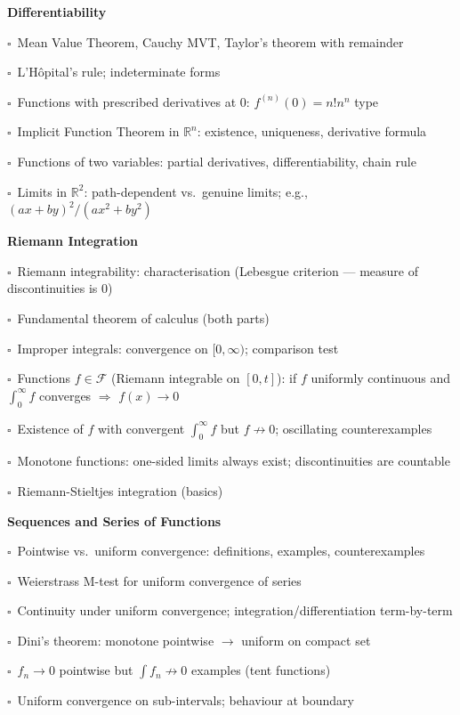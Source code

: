 \documentclass[11pt,a4paper]{article}
\newcommand{\chk}{\textcolor{rulegray}{$\square$}\ }
\begin{document}
\begin{subtopics}
  \item \textbf{Differentiability}
  \begin{subtopics}
    \item \chk Mean Value Theorem, Cauchy MVT, Taylor's theorem with remainder
    \item \chk L'H\^{o}pital's rule; indeterminate forms
    \item \chk Functions with prescribed derivatives at $0$: $f^{(n)}(0)= n!n^n$ type
    \item \chk Implicit Function Theorem in $\mathbb{R}^n$: existence, uniqueness, derivative formula
    \item \chk Functions of two variables: partial derivatives, differentiability, chain rule
    \item \chk Limits in $\mathbb{R}^2$: path-dependent vs.\ genuine limits; e.g., $(ax+by)^2/(ax^2+by^2)$
  \end{subtopics}

  \item \textbf{Riemann Integration}
  \begin{subtopics}
    \item \chk Riemann integrability: characterisation (Lebesgue criterion — measure of discontinuities is 0)
    \item \chk Fundamental theorem of calculus (both parts)
    \item \chk Improper integrals: convergence on $[0,\infty)$; comparison test
    \item \chk Functions $f \in \mathcal{F}$ (Riemann integrable on $[0,t]$): if $f$ uniformly continuous and $\int_0^\infty f$ converges $\Rightarrow$ $f(x)\to 0$
    \item \chk Existence of $f$ with convergent $\int_0^\infty f$ but $f \not\to 0$; oscillating counterexamples
    \item \chk Monotone functions: one-sided limits always exist; discontinuities are countable
    \item \chk Riemann-Stieltjes integration (basics)
  \end{subtopics}

  \item \textbf{Sequences and Series of Functions}
  \begin{subtopics}
    \item \chk Pointwise vs.\ uniform convergence: definitions, examples, counterexamples
    \item \chk Weierstrass M-test for uniform convergence of series
    \item \chk Continuity under uniform convergence; integration/differentiation term-by-term
    \item \chk Dini's theorem: monotone pointwise $\to$ uniform on compact set
    \item \chk $f_n \to 0$ pointwise but $\int f_n \not\to 0$ examples (tent functions)
    \item \chk Uniform convergence on sub-intervals; behaviour at boundary
  \end{subtopics}


\end{subtopics}
\end{document}
